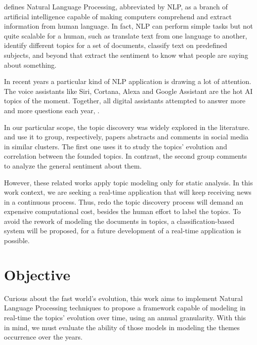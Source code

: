  defines Natural Language Processing, abbreviated by NLP, as a branch of artificial intelligence capable of making computers comprehend and extract information from human language.
In fact, NLP can perform simple tasks but not quite scalable for a human, such as translate text from one language to another, identify different topics for a set of documents, classify text on predefined subjects, and beyond that extract the sentiment to know what people are saying about something.

In recent years a particular kind of NLP application is drawing a lot of attention. The voice assistants like Siri, Cortana, Alexa and Google Assistant are the hot AI topics of the moment. Together, all digital assistants attempted to answer more and more questions each year, \cite{kailakrayewski2019}.

\newpage
In our particular scope, the topic discovery was widely explored in the literature.  and  use it to group, respectively, papers abstracts and comments in social media in similar clusters. The first one uses it to study the topics' evolution and correlation between the founded topics. In contrast, the second group comments to analyze the general sentiment about them.

However, these related works apply topic modeling only for static analysis. In this work context, we are seeking a real-time application that will keep receiving news in a continuous process. Thus, redo the topic discovery process will demand an expensive computational cost, besides the human effort to label the topics. To avoid the rework of modeling the documents in topics, a classification-based system will be proposed, for a future development of a real-time application is possible.


\section{Objective}


Curious about the fast world's evolution, this work aims to implement Natural Language Processing techniques to propose a framework capable of modeling in real-time the topics' evolution over time, using an annual granularity.
With this in mind, we must evaluate the ability of those models in modeling the themes occurrence over the years.

